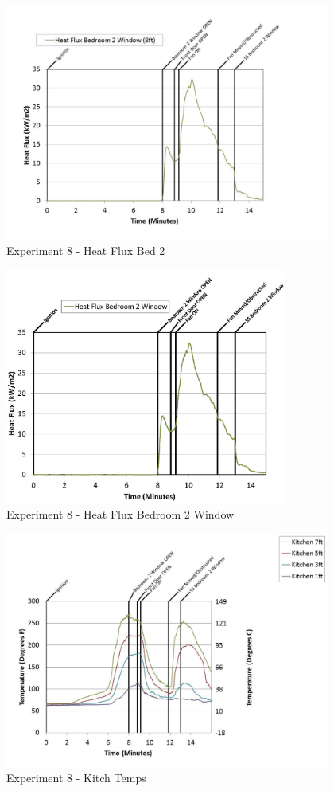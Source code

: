 \documentclass{article}
\begin{document}
\begin{appendices}
	\clearpage

	\begin{figure}[h!]
		\centering
		\includegraphics[height=3.05in]{0_Images/Results_Charts/Exp_8_Charts/HeatFluxBed2.pdf}
		\caption{Experiment 8 - Heat Flux Bed 2}
	\end{figure}
 

	\begin{figure}[h!]
		\centering
		\includegraphics[height=3.05in]{0_Images/Results_Charts/Exp_8_Charts/HeatFluxBedroom2Window.pdf}
		\caption{Experiment 8 - Heat Flux Bedroom 2 Window}
	\end{figure}
 
	\clearpage

	\begin{figure}[h!]
		\centering
		\includegraphics[height=3.05in]{0_Images/Results_Charts/Exp_8_Charts/KitchTemps.pdf}
		\caption{Experiment 8 - Kitch Temps}
	\end{figure}
 


\end{appendices}
\end{document}
